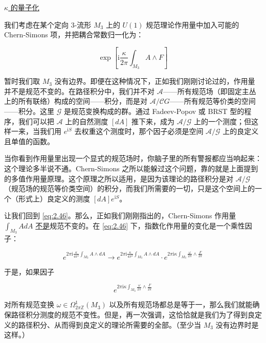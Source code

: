 \medskip\noindent\underline{$\kappa$ 的量子化}%
\par\vspace{2pt}

我们考虑在某个定向 3-流形 $M_3$ 上的 $U(1)$ 规范理论作用量中加入可能的 Chern-Simons 项，并把耦合常数归一化为：

\begin{equation}
  \exp\left[\mathrm{i}\frac{\kappa}{2\pi}\int_{M_3}A\wedge F\right]
  \tag{2.47}
  \label{eq:2.47}
\end{equation}

暂时我们取 $M_3$ 没有边界。即便在这种情况下，正如我们刚刚讨论过的，作用量并不是规范不变的。在路径积分中，我们并不对 $\mathcal{A}$——所有规范场（即固定主丛上的所有联络）构成的空间——积分，而是对 $\mathcal{A}/\mathcal{C}G$——所有规范等价类的空间——积分。这里 $\mathcal{G}$ 是规范变换构成的群。通过 Fadeev-Popov 或 BRST 型的程序，我们可以把 $\mathcal{A}$ 上的自然测度 $[dA]$ 推下来，成为 $\mathcal{A}/\mathcal{G}$ 上的一个测度；但这样一来，当我们用 $e^{\mathrm{i}S}$ 去权重这个测度时，那个因子必须是空间 $\mathcal{A}/\mathcal{G}$ 上的良定义且单值的函数。

当你看到作用量里出现一个显式的规范场时，你脑子里的所有警报都应当响起来：这个理论多半说不通。Chern-Simons 之所以能躲过这个问题，靠的就是上面提到的多值作用量原理。这个原理之所以适用，是因为该理论的路径积分是对 $\mathcal{A}/\mathcal{G}$（规范场的规范等价类空间）的积分，而我们所需要的一切，只是这个空间上的一个（形式上）良定义的测度 $[dA]e^{\mathrm{i}S}$。

让我们回到 \eqref{eq:2.46}。那么，正如我们刚刚指出的，Chern-Simons 作用量 $\int_{M_3}AdA$ \underline{不是}规范不变的。在 \eqref{eq:2.46} 下，指数化作用量的变化是一个乘性因子：

\begin{equation}
  e^{2\pi\mathrm{i}\frac{\kappa}{4\pi^{2}}\int_{M_3}A\wedge dA}\to e^{2\pi\mathrm{i}\frac{\kappa}{4\pi^{2}}\int_{M_3}A\wedge dA}\cdot e^{2\pi\mathrm{i}\kappa\int_{M_3}\frac{\omega}{2\pi}\wedge\frac{F}{2\pi}}
  \tag{2.48}
  \label{eq:2.48}
\end{equation}

于是，如果因子

\begin{equation}
  e^{2\pi\mathrm{i}\kappa\int_{M_3}\frac{\omega}{2\pi}\wedge\frac{F}{2\pi}}
  \tag{2.49}
  \label{eq:2.49}
\end{equation}

对所有规范变换 $\omega\in\Omega^{1}_{2\pi\mathbb{Z}}(M_3)$ 以及所有规范场都总是等于一，那么我们就能确保路径积分测度的规范不变性。但是，再一次强调，这恰恰就是我们为了得到良定义的路径积分、从而得到良定义的理论所需要的全部。（至少当 $M_3$ 没有边界时是这样。）


